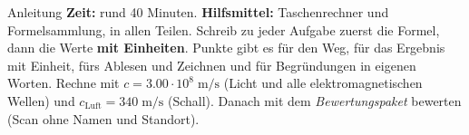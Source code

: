 \documentclass[11pt]{article}
\begin{document}

\begin{lpinfo}{Anleitung}
\textbf{Zeit:} rund 40 Minuten. \textbf{Hilfsmittel:} Taschenrechner und Formelsammlung, in allen Teilen.
Schreib zu jeder Aufgabe zuerst die Formel, dann die Werte \textbf{mit Einheiten}. Punkte gibt es für den Weg,
für das Ergebnis mit Einheit, fürs Ablesen und Zeichnen und für Begründungen in eigenen Worten. Rechne mit
\mbox{$c = 3.00 \cdot 10^{8}\;\text{m/s}$} (Licht und alle elektromagnetischen Wellen) und
\mbox{$c_\text{Luft} = 340\;\text{m/s}$} (Schall).
Danach mit dem \emph{Bewertungspaket} bewerten (Scan ohne Namen und Standort).
\end{lpinfo}

\end{document}
